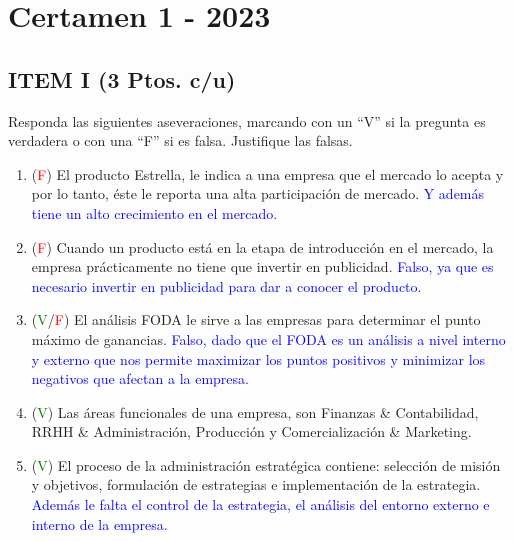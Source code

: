 \documentclass{templateNote}
\begin{document}
\newpage
\section{Certamen 1 - 2023} 

\subsection*{ITEM I (3 Ptos. c/u)}
Responda las siguientes aseveraciones, marcando con un “V” si la pregunta es verdadera o con una “F” si es falsa. Justifique las falsas.   
\begin{enumerate}
    \item (\textcolor{red}{F}) El producto Estrella, le indica a una empresa que el mercado lo acepta y por lo tanto, éste le reporta una alta participación de mercado.\newline
    \textcolor{blue}{
        Y además tiene un alto crecimiento en el mercado.
    }
    
    \item (\textcolor{red}{F}) Cuando un producto está en la etapa de introducción en el mercado, la empresa prácticamente no tiene que invertir en publicidad.\newline
    \textcolor{blue}{
        Falso, ya que es necesario invertir en publicidad para dar a conocer el producto.
    }
    
    \item (\textcolor{green}{V}/\textcolor{red}{F}) El análisis FODA le sirve a las empresas para determinar el punto máximo de ganancias.\newline
    \textcolor{blue}{
        Falso, dado que el FODA es un análisis a nivel interno y externo que nos permite maximizar los puntos positivos y minimizar los negativos que afectan a la empresa.
    }
    
    \item (\textcolor{green}{V}) Las áreas funcionales de una empresa, son Finanzas \& Contabilidad, RRHH \& Administración, Producción y Comercialización \& Marketing.
    
    \item (\textcolor{green}{V}) El proceso de la administración estratégica contiene: selección de misión y objetivos, formulación de estrategias e implementación de la estrategia.\newline
    \textcolor{blue}{
        Además le falta el control de la estrategia, el análisis del entorno externo e interno de la empresa.
    }
    

\end{enumerate}
\end{document}
